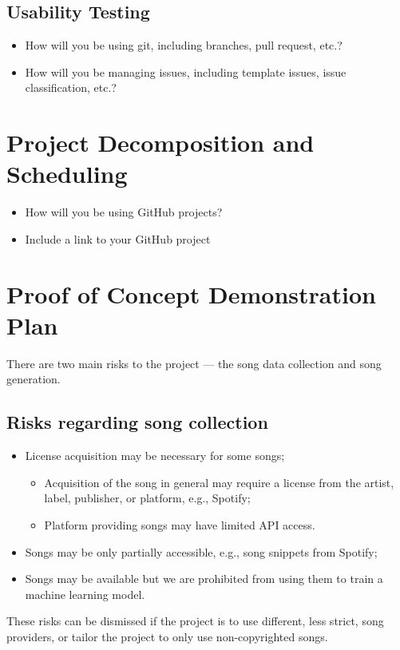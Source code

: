 \documentclass{article}
\begin{document}
\subsection{Usability Testing}
\begin{itemize}
	\item How will you be using git, including branches, pull request, etc.?
	\item How will you be managing issues, including template issues, issue
	classification, etc.?

\end{itemize}

\section{Project Decomposition and Scheduling}

\begin{itemize}
  \item How will you be using GitHub projects?
  \item Include a link to your GitHub project
\end{itemize}


\section{Proof of Concept Demonstration Plan}
There are two main risks to the project --- the song data collection and song generation.

\subsection{Risks regarding song collection}
\begin{itemize}
  \item License acquisition may be necessary for some songs;
  \begin{itemize}
    \item Acquisition of the song in general may require a license from the artist, label, publisher, or platform, e.g., Spotify;
    \item Platform providing songs may have limited API access.
  \end{itemize}
  \item Songs may be only partially accessible, e.g., song snippets from Spotify;
  \item Songs may be available but we are prohibited from using them to train a machine learning model.
\end{itemize}
These risks can be dismissed if the project is to use different, less strict, song providers, or tailor the project to only use non-copyrighted songs.
\end{document}
